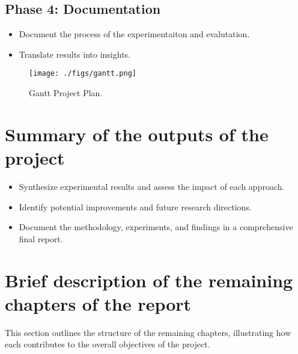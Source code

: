 \documentclass[12pt,a4paper,twoside,openany]{book}
\begin{document}
\subsection*{Phase 4: Documentation}
\begin{itemize}
    \item Document the process of the experimentaiton and evalutation.
    \item Translate results into insights.
\end{itemize}

\begin{figure}[h]
\centering
\texttt{[image: ./figs/gantt.png]}
\caption{Gantt Project Plan.}
\label{fig:gantt}
\end{figure}

\section{Summary of the outputs of the project}

\begin{itemize}
    \item Synthesize experimental results and assess the impact of each approach.
    \item Identify potential improvements and future research directions.
    \item Document the methodology, experiments, and findings in a comprehensive final report.
\end{itemize}

\section{Brief description of the remaining chapters of the report}


This section outlines the structure of the remaining chapters, illustrating how each contributes to the overall objectives of the project.
\end{document}

